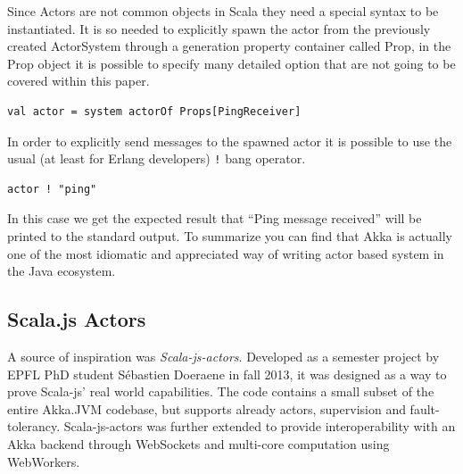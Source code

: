 \documentclass{sig-alternate}
\begin{document}
Since Actors are not common objects in Scala they need a special syntax to be instantiated.
It is so needed to explicitly spawn the actor from the previously created ActorSystem through a generation property container called Prop, in the Prop object it is possible to specify many detailed option that are not going to be covered within this paper.
\begin{lstlisting}
val actor = system actorOf Props[PingReceiver]
\end{lstlisting}

In order to explicitly send messages to the spawned actor it is possible to use the usual (at least for Erlang developers) \verb|!| bang operator.
\begin{lstlisting}
actor ! "ping"
\end{lstlisting}

In this case we get the expected result that ``Ping message received'' will be printed to the standard output.
To summarize you can find that Akka is actually one of the most idiomatic and appreciated way of writing actor based system in the Java ecosystem.

\subsection{Scala.js Actors}

A source of inspiration was \textit{Scala-js-actors}.
Developed as a semester project by EPFL PhD student Sébastien Doeraene in fall 2013, it was designed as a way to prove Scala-js' real world capabilities.
The code contains a small subset of the entire Akka.JVM codebase, but supports already actors, supervision and fault-tolerancy.
Scala-js-actors was further extended to provide interoperability with an Akka backend through WebSockets and multi-core computation using WebWorkers.
\end{document}
